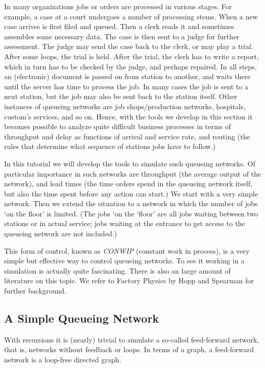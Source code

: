 \documentclass{scrartcl}
\begin{document}
In many organizations jobs or orders are  processed in various stages. For example,  a case at a court undergoes a number of processing stems. When a new case arrives is first filed and queued. Then a clerk reads it and sometimes assembles some necessary data. The case is then sent to a judge for further assessment. The judge may send the case back to the clerk, or may play a trial. After some loops, the trial is held. After the trial, the clerk has to write a report, which in turn has to be checked by the judge, and perhaps repaired. In all steps, an (electronic) document is passed on from station to another, and waits there until the server has time to process the job. In many cases the job is sent to a next station, but the job may also be sent back to the station itself. Other instances of queueing networks are job shops/production networks, hospitals, custom's services, and so on. Hence, with the tools we develop in this section it becomes possible to analyze quite difficult business processes in terms of throughput and delay as functions of arrival and service rate, and routing (the rules that determine what sequence of stations jobs have to follow.)

In this tutorial we will develop the tools to simulate such queueing networks. Of particular importance in such networks are throughput (the average output of the network), and lead times (the time orders spend in the queueing network itself, but also the time spent before any action can start.) We start with a very simple network. Then we extend the situation to a network in which the number of jobs `on the floor' is limited. (The jobs `on the `floor' are all jobs waiting between two stations or in actual service; jobs waiting at the entrance to get access to the queueing network are not included.) 

This form of control, known as \emph{CONWIP} (constant work in process), is a very simple but effective way to control queueing networks. To see it working in a simulation is actually quite fascinating. There is also an large amount of literature on this topic. We refer to Factory Physics by Hopp and Spearman for further background. 


\subsection{A Simple Queueing Network}


With recursions it is (nearly) trivial to simulate a so-called feed-forward network, that is, networks without feedback or loops.  In terms of a graph, a feed-forward network is a loop-free directed graph. 
\end{document}

